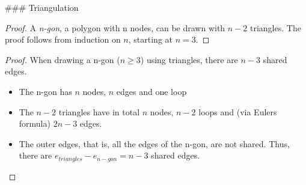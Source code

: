 ### Triangulation

\begin{proof} A \emph{n-gon}, a polygon with n nodes, can be drawn with $n-2$ triangles.
The proof follows from induction on $n$, starting at $n=3$.
\end{proof}

\begin{proof} When drawing a n-gon ($n \geq 3$) using triangles, there are $n-3$ shared edges.
\begin{itemize}
    \item The n-gon has $n$ nodes, $n$ edges and one loop
    \item The $n-2$ triangles have in total $n$ nodes, $n-2$ loops and (via Eulers formula) $2n-3$ edges.
    \item The outer edges, that is, all the edges of the n-gon, are not shared. Thus, there are $e_{triangles} - e_{n-gon} = n-3$ shared edges.
\end{itemize}
\end{proof}



